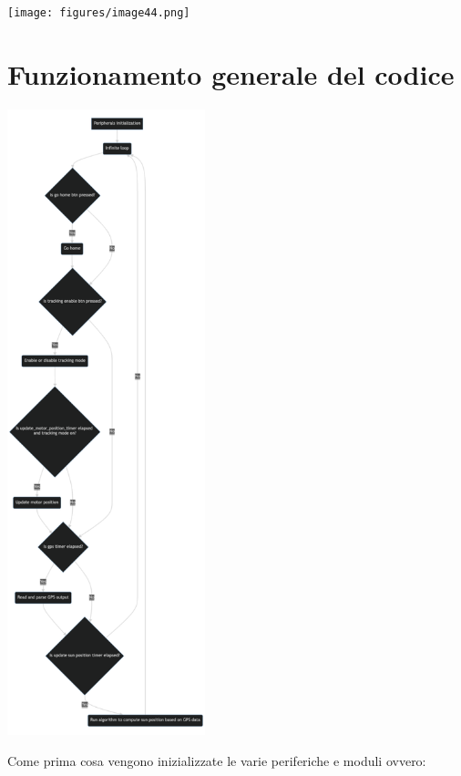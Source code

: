 \begin{center}
\texttt{[image: figures/image44.png]}
\captionsetup{type=figure}
\end{center}

\hypertarget{funzionamento-generale-del-codice}{%
\section{Funzionamento generale del
codice}\label{funzionamento-generale-del-codice}}

\begin{center}
\includegraphics[width=0.43\textwidth]{figures/image36.png}
\captionsetup{type=figure}
\end{center}

\noindent Come prima cosa vengono inizializzate le varie periferiche e moduli
ovvero:

